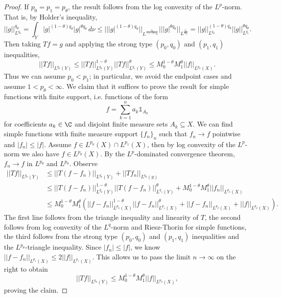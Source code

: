 \documentclass[reqno]{amsart}
\theoremstyle{definition}
\theoremstyle{remark}
\begin{document}
\begin{proof}
	If $p_0 = p_1 = p_\theta$, the result follows from the log convexity of the $L^p$-norm. That is, by Holder's inequality, 
		\[ || g||_{L^{q_\theta}}^{q_\theta} = \int_Y |g|^{(1 - \theta)q_\theta} |g|^{\theta q_\theta} \, d\nu \leq |||g|^{(1 - \theta)q_\theta} ||_{L^{\frac{q_0}{(1 - \theta)q_\theta}}} |||g|^{\theta q_\theta} ||_{L^\frac{q_1}{\theta q_\theta}} = ||g||_{L^{q_0}}^{(1 - \theta) q_\theta} ||g||_{L^{q_1}}^{\theta q_\theta}.\]
	Then taking $Tf = g$ and applying the strong type $(p_0, q_0)$ and $(p_1, q_1)$ inequalities, 
		\[ ||Tf||_{L^{q_\theta} (Y)} \leq ||Tf||_{L^{q_0} (Y)}^{1 - \theta} ||Tf||_{L^{q_1} (Y)}^{\theta} \leq M_0^{1 - \theta} M_1^\theta ||f||_{L^{p_\theta} (X)}. \]	
	Thus we can assume $p_0 < p_1$; in particular, we avoid the endpoint cases and assume $1 < p_\theta < \infty$. We claim that it suffices to prove the result for simple functions with finite support, i.e. functions of the form 	
		\[ f = \sum_{k = 1}^n a_k \mathbb 1_{A_k} \]
	for coefficients $a_k \in \C$ and disjoint finite measure sets $A_k \subseteq X$. We can find simple functions with finite measure support $\{f_n\}_n$ such that $f_n \to f$ pointwise and $|f_n| \leq |f|$. Assume $f \in L^{p_0} (X) \cap L^{p_1} (X)$, then by log convexity of the $L^p$-norm we also have $f \in L^{p_\theta} (X)$. By the $L^p$-dominated convergence theorem, $f_n \to f$ in $L^{p_\theta}$ and $L^{p_0}$. Observe
	\begin{align*}
		||Tf||_{L^{q_\theta} (Y)} 
			&\leq ||T(f - f_n)||_{L^{q_\theta} (Y)} + ||Tf_n||_{L^{q_\theta} (y)}\\
			&\leq ||T(f - f_n)||_{L^{q_0} (Y)}^{1 - \theta} ||T(f - f_n)||_{L^{q_1} (Y)}^{\theta} + M_0^{1 - \theta} M_1^\theta ||f_n||_{L^{p_\theta} (X)} \\
			&\leq M_0^{1 - \theta} M_1^\theta \left( ||f - f_n||_{L^{p_0} (X)}^{1 - \theta} ||f - f_n||_{L^{p_1} (X)}^{\theta} + ||f - f_n||_{L^{p_\theta} (X)} + ||f||_{L^{p_\theta} (X)}\right).
	\end{align*}
	The first line follows from the triangle inequality and linearity of $T$, the second follows from log convexity of the $L^q$-norm and Riesz-Thorin for simple functions, the third follows from the strong type $(p_0, q_0)$ and $(p_1, q_1)$ inequalities and the $L^{p_\theta}$-triangle inequality. Since $|f_n| \leq |f|$, we know $||f - f_n||_{L^{p_1} (X)} \leq 2 ||f||_{L^{p_1} (X)}$. This allows us to pass the limit $n \to \infty$ on the right to obtain
		\[ ||Tf||_{L^{q_\theta} (Y)} \leq M_0^{1 - \theta} M_1^\theta ||f||_{L^{p_\theta} (X)}, \]
	proving the claim. 
	

\end{proof}
\end{document}
